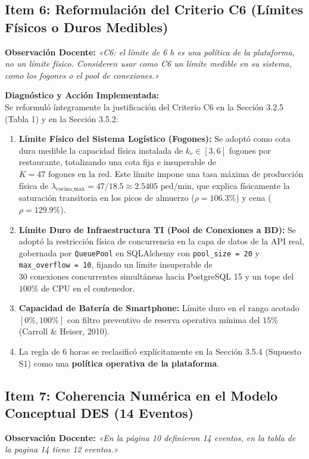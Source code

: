 \documentclass[11pt,letterpaper]{article}
\begin{document}
\subsection{Item 6: Reformulación del Criterio C6 (Límites Físicos o Duros Medibles)}
\noindent \textbf{Observación Docente:} \textit{«C6: el límite de 6 h es una política de la plataforma, no un límite físico. Consideren usar como C6 un límite medible en su sistema, como los fogones o el pool de conexiones.»}

\vspace{0.4em}
\noindent \textbf{Diagnóstico y Acción Implementada:} \\
Se reformuló íntegramente la justificación del Criterio C6 en la Sección 3.2.5 (Tabla 1) y en la Sección 3.5.2:
\begin{enumerate}[leftmargin=1.5em, itemsep=0.2em]
    \item \textbf{Límite Físico del Sistema Logístico (Fogones):} Se adoptó como cota dura medible la capacidad física instalada de $k_r \in [3, 6]$ fogones por restaurante, totalizando una cota fija e insuperable de \textbf{$K = 47\text{ fogones en la red}$}. Este límite impone una tasa máxima de producción física de $\lambda_{\text{cocina\_max}} = 47 / 18.5 \approx 2.5405\text{ ped/min}$, que explica físicamente la saturación transitoria en los picos de almuerzo ($\rho = 106.3\%$) y cena ($\rho = 129.9\%$).
    \item \textbf{Límite Duro de Infraestructura TI (Pool de Conexiones a BD):} Se adoptó la restricción física de concurrencia en la capa de datos de la API real, gobernada por \texttt{QueuePool} en SQLAlchemy con \texttt{pool\_size = 20} y \texttt{max\_overflow = 10}, fijando un límite insuperable de \textbf{$30\text{ conexiones concurrentes simultáneas}$} hacia PostgreSQL 15 y un tope del $100\%$ de CPU en el contenedor.
    \item \textbf{Capacidad de Batería de Smartphone:} Límite duro en el rango acotado $[0\%, 100\%]$ con filtro preventivo de reserva operativa mínima del $15\%$ (Carroll \& Heiser, 2010).
    \item La regla de 6 horas se reclasificó explícitamente en la Sección 3.5.4 (Supuesto S1) como una \textbf{política operativa de la plataforma}.
\end{enumerate}

\subsection{Item 7: Coherencia Numérica en el Modelo Conceptual DES (14 Eventos)}
\noindent \textbf{Observación Docente:} \textit{«En la página 10 definieron 14 eventos, en la tabla de la pagina 14 tiene 12 eventos.»}
\end{document}

